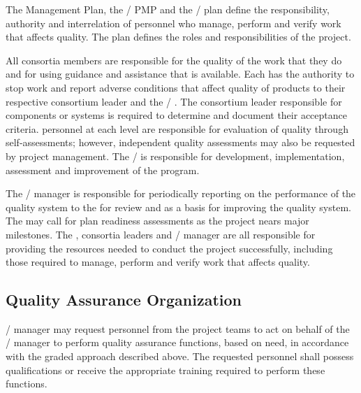The  Management Plan, the / PMP
and the /  plan define the
responsibility, authority and interrelation of personnel who manage,
perform and verify work that affects quality. The  plan
defines the  roles and responsibilities of the 
project.

All consortia members are responsible for the quality of the work that
they do and for using guidance and assistance that is available. Each
has the authority to stop work and report adverse conditions that
affect quality of  products to their respective
 consortium leader and the /
. The consortium leader responsible for 
components or systems is required to determine and document their
acceptance criteria.  personnel at each level are
responsible for evaluation of quality through self-assessments;
however, independent quality assessments may also be requested by
project management.  The /  is
responsible for development, implementation, assessment and
improvement of the  program.

The /  manager is responsible for
periodically reporting on the performance of the quality system to the
  for review and as a basis for improving
the quality system. The   may call for
 plan readiness assessments as the project nears major
milestones. The  , consortia leaders and
/  manager are all responsible for
providing the resources needed to conduct the project successfully,
including those required to manage, perform and verify work that
affects quality.

\subsection{Quality Assurance Organization}

/  manager may request personnel
from the  project teams to act on behalf of the
/  manager to perform quality
assurance functions, based on need, in accordance with the graded
approach described above. The requested personnel shall possess
qualifications or receive the appropriate training required to perform
these functions.

